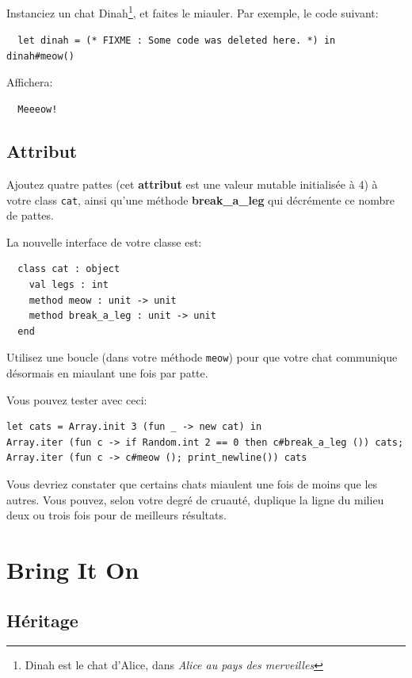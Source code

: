 \documentclass[a4paper]{article}
\begin{document}
Instanciez un chat Dinah\footnote{Dinah est le chat d'Alice, dans \textit{Alice
au pays des merveilles}}, et faites le miauler. Par exemple, le code suivant:

\vspace{3mm}
\verb|  let dinah = (* FIXME : Some code was deleted here. *) in dinah#meow()|
\vspace{3mm}

Affichera:

\vspace{3mm}
\verb|  Meeeow!|
\vspace{3mm}

\subsection{Attribut}

Ajoutez quatre pattes (cet \textbf{attribut} est une valeur mutable initialisée
à 4) à votre class \verb|cat|, ainsi qu'une méthode \textbf{break\_a\_leg} qui
décrémente ce nombre de pattes.

La nouvelle
interface de votre classe est:
\vspace{3mm}
\begin{verbatim}
  class cat : object
    val legs : int
    method meow : unit -> unit
    method break_a_leg : unit -> unit
  end
\end{verbatim}
\vspace{3mm}

Utilisez une boucle (dans votre méthode \verb|meow|) pour que votre chat
communique désormais en miaulant une fois par patte.

\newpage

Vous pouvez tester avec ceci:

\begin{verbatim}
let cats = Array.init 3 (fun _ -> new cat) in
Array.iter (fun c -> if Random.int 2 == 0 then c#break_a_leg ()) cats;
Array.iter (fun c -> c#meow (); print_newline()) cats
\end{verbatim}

Vous devriez constater que certains chats miaulent une fois de moins que les
autres. Vous pouvez, selon votre degré de cruauté, duplique la ligne du milieu
deux ou trois fois pour de meilleurs résultats.

\section{Bring It On}

\subsection{Héritage}
\end{document}
